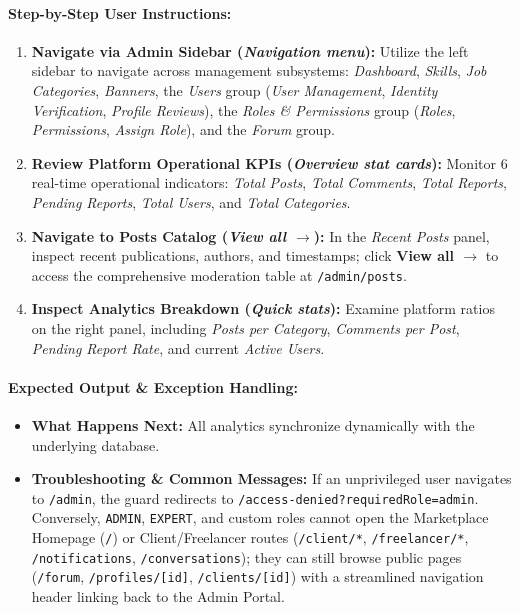 \paragraph{Step-by-Step User Instructions:}
\begin{enumerate}[leftmargin=1.8em,itemsep=3pt]
  \item {} \textbf{Navigate via Admin Sidebar (\textit{Navigation menu}):} Utilize the left sidebar to navigate across management subsystems: \textit{Dashboard}, \textit{Skills}, \textit{Job Categories}, \textit{Banners}, the \textit{Users} group (\textit{User Management}, \textit{Identity Verification}, \textit{Profile Reviews}), the \textit{Roles \& Permissions} group (\textit{Roles}, \textit{Permissions}, \textit{Assign Role}), and the \textit{Forum} group.
  \item {} \textbf{Review Platform Operational KPIs (\textit{Overview stat cards}):} Monitor 6 real-time operational indicators: \textit{Total Posts}, \textit{Total Comments}, \textit{Total Reports}, \textit{Pending Reports}, \textit{Total Users}, and \textit{Total Categories}.
  \item {} \textbf{Navigate to Posts Catalog (\textit{View all $\rightarrow$}):} In the \textit{Recent Posts} panel, inspect recent publications, authors, and timestamps; click \textbf{View all $\rightarrow$} to access the comprehensive moderation table at \texttt{/admin/posts}.
  \item {} \textbf{Inspect Analytics Breakdown (\textit{Quick stats}):} Examine platform ratios on the right panel, including \textit{Posts per Category}, \textit{Comments per Post}, \textit{Pending Report Rate}, and current \textit{Active Users}.
\end{enumerate}

\paragraph{Expected Output \& Exception Handling:}
\begin{itemize}[leftmargin=1.5em,itemsep=2pt]
  \item \textbf{What Happens Next:} All analytics synchronize dynamically with the underlying database.
  \item {\sloppy \textbf{Troubleshooting \& Common Messages:} If an unprivileged user navigates to \texttt{/admin}, the guard redirects to \texttt{/access-\allowbreak{}denied?requiredRole=admin}. Conversely, \texttt{ADMIN}, \texttt{EXPERT}, and custom roles cannot open the Marketplace Homepage (\texttt{/}) or Client/Freelancer routes (\texttt{/client/*}, \texttt{/freelancer/*}, \texttt{/notifications}, \texttt{/\allowbreak{}conversations}); they can still browse public pages (\texttt{/forum}, \texttt{/profiles/\allowbreak{}[id]}, \texttt{/clients/\allowbreak{}[id]}) with a streamlined navigation header linking back to the Admin Portal.\par}
\end{itemize}

